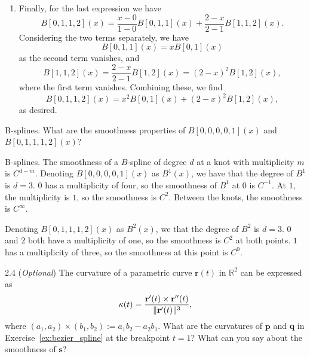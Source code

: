 \begin{solution}{3.5}
\begin{enumerate}[
    label=\alph*) %
            ]
        \item Finally, for the last expression we have
            \begin{equation*}
                B[0, 1, 1, 2](x)
                = \frac{x - 0}{1 - 0} B[0, 1, 1](x)
                + \frac{2 - x}{2 - 1} B[1, 1, 2](x).
            \end{equation*}
            Considering the two terms separately, we have
            \begin{equation*}
                B[0, 1, 1](x)
                = x B[0, 1](x)
            \end{equation*}
            as the second term vanishes, and
            \begin{equation*}
                B[1, 1, 2](x)
                = \frac{2 - x}{2 - 1} B[1, 2](x)
                = (2 -x)^2 B[1, 2](x),
            \end{equation*}
            where the first term vanishes.
            Combining these, we find
            \begin{equation*}
                B[0, 1, 1, 2](x)
                = x^2 B[0, 1](x) + (2 - x)^2 B[1, 2](x),
            \end{equation*}
            as desired.
    \end{enumerate}
\end{solution}

\begin{exercise}{B-splines.}
    What are the smoothness properties of $B[0, 0, 0, 0, 1](x)$ and $B[0, 1, 1, 1, 2](x)$?
\end{exercise}

\begin{solution}{B-splines.}
    The smoothness of a $B$-spline of degree $d$ at a knot with multiplicity $m$ is $C^{d-m}$.
    Denoting $B[0, 0, 0, 0, 1](x)$ as $B^1(x)$, we have that the degree of $B^1$ is $d = 3$.
    $0$ has a multiplicity of four, so the smoothness of $B^1$ at $0$ is $C^{-1}$.
    At $1$, the multiplicity is $1$, so the smoothness is $C^2$.
    Between the knots, the smoothness is $C^\infty$.

    Denoting $B[0, 1, 1, 1, 2](x)$ as $B^2(x)$, we that the degree of $B^2$ is $d = 3$.
    $0$ and $2$ both have a multiplicity of one, so the smoothness is $C^2$ at both points.
    $1$ has a multiplicity of three, so the smoothness at this point is $C^{0}$.
\end{solution}

\begin{exercise}{2.4 (\textit{Optional})}
    The curvature of a parametric curve $\mathbf{r}(t)$ in $\mathbb{R}^2$ can be expressed as
    \begin{equation*}
        \kappa(t) = \frac{\mathbf{r}'(t) \times \mathbf{r}''(t)}{\lVert\mathbf{r}'(t)\rVert^3},
    \end{equation*}
    where $(a_1, a_2) \times (b_1, b_2) := a_1 b_2 - a_2 b_1$.
    What are the curvatures of $\mathbf{p}$ and $\mathbf{q}$ in Exercise~\ref{ex:bezier_spline} at the breakpoint $t = 1$?
    What can you say about the smoothness of $\mathbf{s}$?
\end{exercise}

